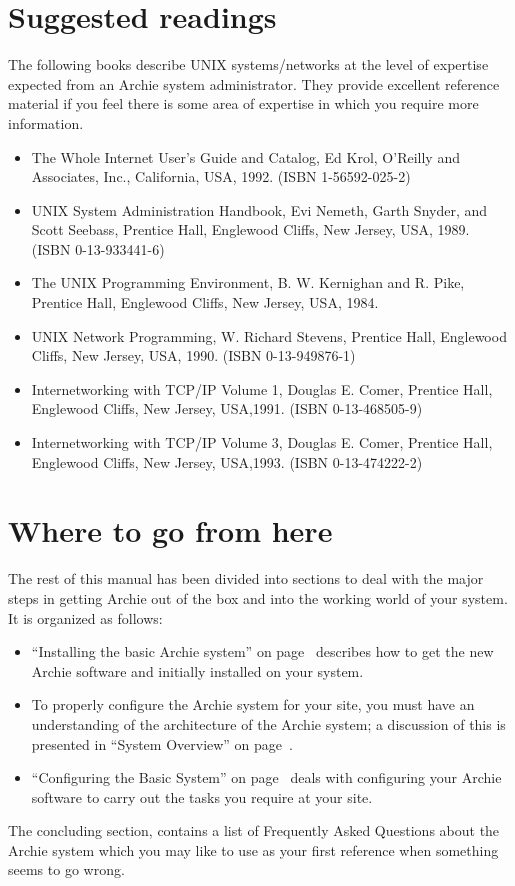 \section{Suggested readings}

The following books describe UNIX systems/networks at the level of expertise
expected from an Archie system administrator. They provide excellent reference
material if you feel there is some area of expertise in which you require more
information.

\begin{itemize}
\item
The Whole Internet User's Guide and Catalog, Ed Krol, O'Reilly and
Associates, Inc., California, USA, 1992. (ISBN 1-56592-025-2)

\item
UNIX System Administration Handbook, Evi Nemeth, Garth Snyder, and Scott
Seebass, Prentice Hall, Englewood Cliffs, New Jersey, USA, 1989. (ISBN
0-13-933441-6)

\item
The UNIX Programming Environment, B. W. Kernighan and R. Pike, Prentice Hall,
Englewood Cliffs, New Jersey, USA, 1984.

\item
UNIX Network Programming, W. Richard Stevens, Prentice Hall, Englewood Cliffs,
New Jersey, USA, 1990. (ISBN 0-13-949876-1)

\item
Internetworking with TCP/IP Volume 1, Douglas E. Comer, Prentice Hall,
Englewood Cliffs, New Jersey, USA,1991. (ISBN 0-13-468505-9)

\item
Internetworking with TCP/IP Volume 3, Douglas E. Comer, Prentice Hall,
Englewood Cliffs, New Jersey, USA,1993. (ISBN 0-13-474222-2)
\end{itemize}



\section{Where to go from here}

The rest of this manual has been divided into sections to deal with the major
steps in getting Archie out of the box and into the working world of your
system. It is organized as follows:

\begin{itemize}

\item
``Installing the basic Archie system'' on page~\pageref{chap:install}
describes how to get the new
Archie software and initially installed on your system.

\item 
To properly configure the Archie system for your site, you must have an
understanding of the architecture of the Archie system; a discussion of this
is presented in ``System Overview'' on page~\pageref{chap:overview}.

\item
``Configuring the Basic System'' on page~\pageref{chap:configure}
deals with configuring your Archie
software to carry out the tasks you require at your site.
\end{itemize}

The concluding section, contains a list of Frequently Asked Questions about
the Archie system which you may like to use as your first reference when
something seems to go wrong.

